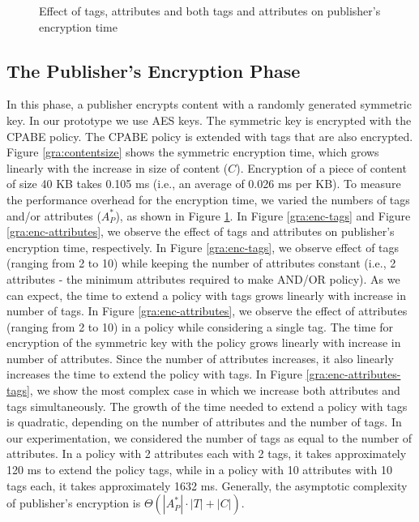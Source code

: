 \documentclass[epsfig,a4paper,11pt,titlepage]{book}
\numberwithin{algorithm}{chapter}
\begin{document}
\begin{figure}
\centering


\caption[Effect of tags and attributes on publisher's encryption time]{Effect of  tags,  attributes and  both tags and attributes on publisher's encryption time}
\label{fig:pidgin-pub-enc}
\end{figure}

\iffalse
Tag = 51.78
Trapdoor = 28.47
Match = 13.28
\fi

\subsection{The Publisher's Encryption Phase}
In this phase, a publisher encrypts content with a randomly generated symmetric key. In our prototype we use \gls{AES} keys. 
The symmetric key is encrypted with the \gls{CPABE} policy. The \gls{CPABE} policy is extended with tags that are also encrypted. 
Figure \ref{gra:contentsize} shows the symmetric encryption time, which grows linearly with the increase in size of content ($C$). Encryption of a piece of content of size 40 \gls{KB} takes 0.105 \gls{ms} (i.e., an average of 0.026 \gls{ms} per \gls{KB}). To measure the performance overhead for the encryption time, we varied the numbers of tags and/or attributes ($A_P^*$), as shown in Figure \ref{fig:pidgin-pub-enc}. In Figure \ref{gra:enc-tags} and Figure \ref{gra:enc-attributes}, we observe the effect of tags and attributes on publisher's encryption time, respectively. In Figure \ref{gra:enc-tags}, we observe effect of tags (ranging from 2 to 10) while keeping the number of attributes constant (i.e., 2 attributes - the minimum attributes required to make AND/OR policy). As we can expect, the time to extend a policy with tags grows linearly with increase in number of tags. In Figure \ref{gra:enc-attributes}, we observe the effect of attributes (ranging from 2 to 10) in a policy while considering a single tag. The time for encryption of the symmetric key with the policy grows linearly with increase in number of attributes. Since the number of attributes increases, it also linearly increases the time to extend the policy with tags. In Figure \ref{gra:enc-attributes-tags}, we show the most complex case in which we increase both attributes and tags simultaneously. The growth of the time needed to extend a policy with tags is quadratic, depending on the number of attributes and the number of tags. In our experimentation, we considered the number of tags as equal to the number of attributes. In a policy with 2 attributes each with 2 tags, it takes approximately 120 \gls{ms} to extend the policy tags, while in a policy with 10 attributes with 10 tags each, it takes approximately 1632 \gls{ms}. Generally, the asymptotic complexity of publisher's encryption is ${\Theta}(|A_P^*| \cdot |T| + |C|)$. 
\end{document}
